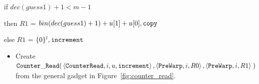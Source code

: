 \begin{itemize}
    \vspace{.5cm}

    if $dec(guess1) + 1 < m - 1$

    then $R1$ = $bin(dec(guess1) + 1)+u[1]+u[0], {\tt copy}$

    else $R1$ = $\{0 \}^l, {\tt increment}$

    \vspace{.5cm}

    \begin{itemize}
        \item Create
        $\begin{aligned}[t]
            {\tt Counter\_Read}(& \left\langle {\tt CounterRead}, i,  u, {\tt increment} \right\rangle,
                     \left\langle {\tt PreWarp},     i, R0                  \right\rangle,
                     \left\langle {\tt PreWarp},     i, R1                  \right\rangle \;)
        \end{aligned}$\\from the general gadget in Figure~\ref{fig:counter_read}.
    \end{itemize}

\end{itemize}

